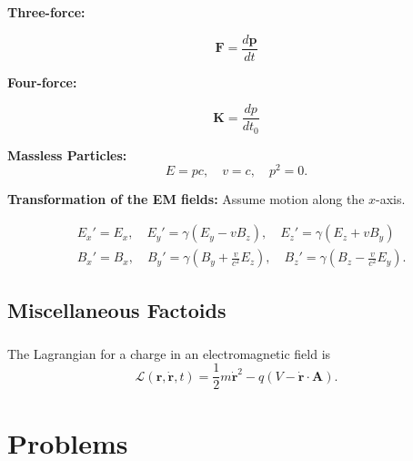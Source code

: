 \documentclass{book}
\theoremstyle{definition}
\newcommand{\lag}{\mathcal{L}}
\newcommand{\f}[2]{\frac{#1}{#2}}
\newcommand{\lp}{\left(}
\newcommand{\rp}{\right)}
\begin{document}
\noindent \textbf{Three-force:}

\begin{equation*}
\textbf{F} = \f{d \textbf{p}}{dt}
\end{equation*}


\noindent \textbf{Four-force:}

\begin{equation*}
\textbf{K} = \f{dp}{dt_0}
\end{equation*}



\noindent \textbf{Massless Particles:}
\begin{equation*}
E = pc,\quad v = c, \quad p^2 = 0.
\end{equation*}




\noindent \textbf{Transformation of the EM fields:} Assume motion along the $x$-axis.


\begin{align*}
&E_x' = E_x, \quad E_y' = \gamma(E_y - v B_z), \quad E_z' = \gamma(E_z + vB_y)\\
&B_x' = B_x, \quad B_y' = \gamma\lp B_y + \f{v}{c^2} E_z\rp, \quad B_z' = \gamma(B_z - \f{v}{c^2} E_y).
\end{align*}




\section{Miscellaneous Factoids}

\subsection{}

The Lagrangian for a charge in an electromagnetic field is 
\begin{equation*}
\lag(\mathbf{r}, \dot{\mathbf{r}},t) = \f{1}{2}m \dot{\mathbf{r}}^2 - q(V - \dot{\mathbf{r}}\cdot \mathbf{A}).
\end{equation*}




\chapter{Problems}




 

\end{document}
